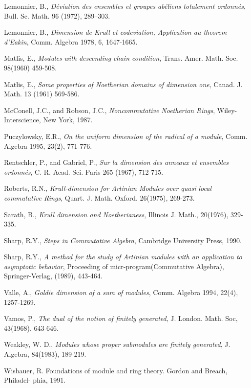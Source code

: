 \begin{thebibliography}{47}
Lemonnier, B., {\it D\'{e}viation des ensembles et groupes ab\'{e}liens
totalement ordonn\'{e}s}, Bull. Sc. Math. 96 (1972), 289--303.

Lemonnier, B., {\it Dimension de Krull et codeviation, Application au theorem d'Eakin}, Comm. Algebra 1978, 6, 1647-1665.

Matlis, E., {\it Modules with descending chain condition}, Trans. Amer. Math. Soc. 98(1960) 459-508.
	
Matlis, E., {\it Some properties of Noetherian domains of dimension one}, Canad. J. Math. 13 (1961) 569-586.

McConell, J.C., and Robson, J.C., {\it Noncommutative Noetherian Rings}, Wiley-Interscience, New York, 1987. 

Puczylowsky, E.R., {\it On the uniform dimension of the radical of a module}, Comm. Algebra 1995, 23(2), 771-776.

Rentschler, P., and Gabriel, P., {\it Sur la dimension des anneaux et ensembles ordonn\'{e}s}, C. R. Acad. Sci. Paris 265 (1967), 712-715.

Roberts, R.N., {\it Krull-dimension for Artinian Modules over
quasi local commutative Rings}, Quart. J. Math. Oxford. 26(1975),
269-273.

Sarath, B., {\it Krull dimension and Noetherianess}, Illinois J. Math., 20(1976), 329-335.

Sharp, R.Y., {\it Steps in Commutative Algebra}, Cambridge University Press, 1990.

Sharp, R.Y., {\it A method for the study of Artinian modules with an application to asymptotic behavior}, Proceeding of micr-program(Commutative Algebra), Springer-Verlag, (1989), 443-464.

Valle, A., {\it Goldie dimension of a sum of modules}, Comm. Algebra 1994, 22(4), 1257-1269.

Vamos, P., {\it The dual of the notion of finitely generated}, J. London. Math. Soc,   43(1968), 643-646. 

Weakley, W. D., {\it Modules whose proper submodules are finitely generated}, J. Algebra, 84(1983), 189-219.

Wisbauer, R. Foundations of module and ring theory. Gordon and Breach, Philadel-
phia, 1991.

\end{thebibliography}

